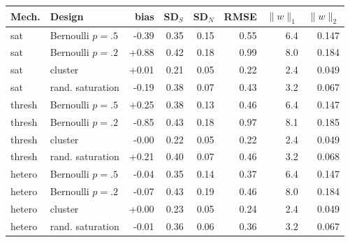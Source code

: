\begin{tabular}{llrrrrrr}
\toprule
Mech. & Design & bias & SD$_S$ & SD$_N$ & RMSE & $\|w\|_1$ & $\|w\|_2$ \\
\midrule
sat & Bernoulli $p{=}.5$ & -0.39 & 0.35 & 0.15 & 0.55 & 6.4 & 0.147 \\
sat & Bernoulli $p{=}.2$ & +0.88 & 0.42 & 0.18 & 0.99 & 8.0 & 0.184 \\
sat & cluster & +0.01 & 0.21 & 0.05 & 0.22 & 2.4 & 0.049 \\
sat & rand. saturation & -0.19 & 0.38 & 0.07 & 0.43 & 3.2 & 0.067 \\
thresh & Bernoulli $p{=}.5$ & +0.25 & 0.38 & 0.13 & 0.46 & 6.4 & 0.147 \\
thresh & Bernoulli $p{=}.2$ & -0.85 & 0.43 & 0.18 & 0.97 & 8.1 & 0.185 \\
thresh & cluster & -0.00 & 0.22 & 0.05 & 0.22 & 2.4 & 0.049 \\
thresh & rand. saturation & +0.21 & 0.40 & 0.07 & 0.46 & 3.2 & 0.068 \\
hetero & Bernoulli $p{=}.5$ & -0.04 & 0.35 & 0.14 & 0.37 & 6.4 & 0.147 \\
hetero & Bernoulli $p{=}.2$ & -0.07 & 0.43 & 0.19 & 0.46 & 8.0 & 0.184 \\
hetero & cluster & +0.00 & 0.23 & 0.05 & 0.24 & 2.4 & 0.049 \\
hetero & rand. saturation & -0.01 & 0.36 & 0.06 & 0.36 & 3.2 & 0.067 \\
\bottomrule
\end{tabular}
